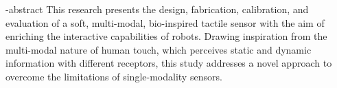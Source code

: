 \en-abstract{
This research presents the design, fabrication, calibration, and evaluation of a soft, multi-modal, bio-inspired tactile sensor with the aim of enriching the interactive capabilities of robots. Drawing inspiration from the multi-modal nature of human touch, which perceives static and dynamic information with different receptors, this study addresses a novel approach to overcome the limitations of single-modality sensors.
}

